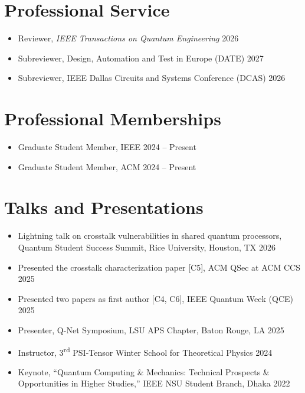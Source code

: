 \documentclass[letterpaper,11pt]{article}
\newenvironment{cvblock}
  {\par\noindent\begin{minipage}[t]{\textwidth}\raggedright}
  {\end{minipage}\par\vspace{5pt}}
\begin{document}
\section{Professional Service}
\begin{cvblock}
\begin{itemize}
  \item Reviewer, \textit{IEEE Transactions on Quantum Engineering} \hfill 2026
  \item Subreviewer, Design, Automation and Test in Europe (DATE) \hfill 2027
  \item Subreviewer, IEEE Dallas Circuits and Systems Conference (DCAS) \hfill 2026
\end{itemize}
\end{cvblock}

\section{Professional Memberships}
\begin{cvblock}
\begin{itemize}
  \item Graduate Student Member, IEEE \hfill 2024 -- Present
  \item Graduate Student Member, ACM \hfill 2024 -- Present
\end{itemize}

\end{cvblock}

\section{Talks and Presentations}
\begin{cvblock}
\begin{itemize}
  \item Lightning talk on crosstalk vulnerabilities in shared quantum processors, Quantum Student Success Summit, Rice University, Houston, TX \hfill 2026
  \item Presented the crosstalk characterization paper [C5], ACM QSec at ACM CCS \hfill 2025
  \item Presented two papers as first author [C4, C6], IEEE Quantum Week (QCE) \hfill 2025
  \item Presenter, Q-Net Symposium, LSU APS Chapter, Baton Rouge, LA \hfill 2025
  \item Instructor, 3\textsuperscript{rd} PSI-Tensor Winter School for Theoretical Physics \hfill 2024
  \item Keynote, ``Quantum Computing \& Mechanics: Technical Prospects \& Opportunities in Higher Studies,'' IEEE NSU Student Branch, Dhaka \hfill 2022
\end{itemize}
\end{cvblock}
\end{document}
